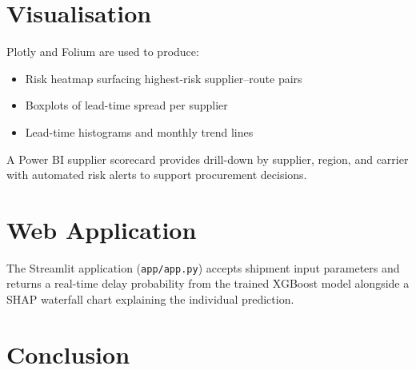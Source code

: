 \documentclass[runningheads]{llncs}
\begin{document}
\section{Visualisation}

Plotly and Folium are used to produce:
\begin{itemize}
  \item Risk heatmap surfacing highest-risk supplier--route pairs
  \item Boxplots of lead-time spread per supplier
  \item Lead-time histograms and monthly trend lines
\end{itemize}

A Power BI supplier scorecard provides drill-down by supplier, region, and
carrier with automated risk alerts to support procurement decisions.


\section{Web Application}

The Streamlit application (\texttt{app/app.py}) accepts shipment input parameters
and returns a real-time delay probability from the trained XGBoost model alongside
a SHAP waterfall chart explaining the individual prediction.


\section{Conclusion}




\end{document}
